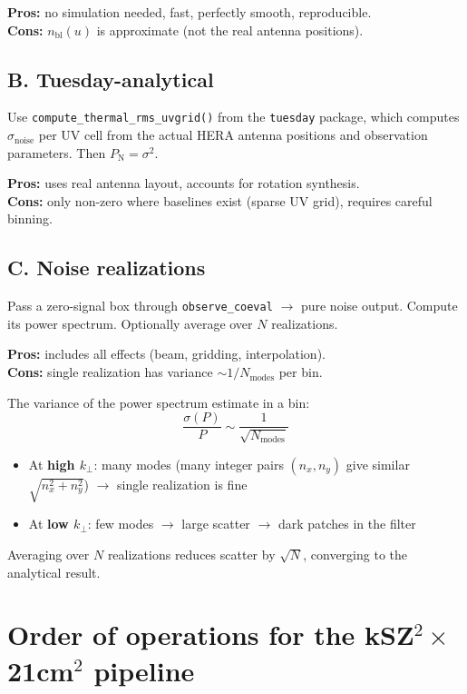 \documentclass[11pt,a4paper]{article}
\newcommand{\kperp}{k_\perp}
\newcommand{\Pnoise}{P_\mathrm{N}}
\newcommand{\nbl}{n_\mathrm{bl}}
\begin{document}
\textbf{Pros:} no simulation needed, fast, perfectly smooth, reproducible.\\
\textbf{Cons:} $\nbl(u)$ is approximate (not the real antenna positions).

\subsection{B. Tuesday-analytical}

Use \texttt{compute\_thermal\_rms\_uvgrid()} from the \texttt{tuesday} package, which computes $\sigma_\mathrm{noise}$ per UV cell from the actual HERA antenna positions and observation parameters. Then $\Pnoise = \sigma^2$.

\textbf{Pros:} uses real antenna layout, accounts for rotation synthesis.\\
\textbf{Cons:} only non-zero where baselines exist (sparse UV grid), requires careful binning.

\subsection{C. Noise realizations}

Pass a zero-signal box through \texttt{observe\_coeval} $\to$ pure noise output. Compute its power spectrum. Optionally average over $N$ realizations.

\textbf{Pros:} includes all effects (beam, gridding, interpolation).\\
\textbf{Cons:} single realization has variance $\sim 1/N_\mathrm{modes}$ per bin.

The variance of the power spectrum estimate in a bin:
\begin{equation}
    \frac{\sigma(P)}{P} \sim \frac{1}{\sqrt{N_\mathrm{modes}}}
\end{equation}
\begin{itemize}
    \item At \textbf{high $\kperp$}: many modes (many integer pairs $(n_x, n_y)$ give similar $\sqrt{n_x^2 + n_y^2}$) $\to$ single realization is fine
    \item At \textbf{low $\kperp$}: few modes $\to$ large scatter $\to$ dark patches in the filter
\end{itemize}
Averaging over $N$ realizations reduces scatter by $\sqrt{N}$, converging to the analytical result.

\section{Order of operations for the kSZ$^2\times$21cm$^2$ pipeline}
\end{document}
